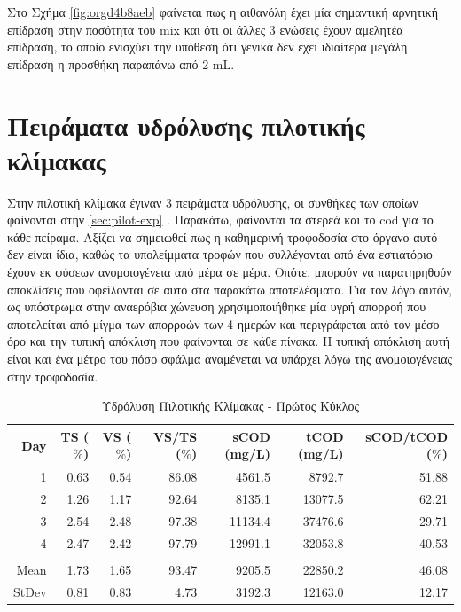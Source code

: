 \documentclass[11pt]{report}
\begin{document}
Στο Σχήμα \ref{fig:orgd4b8aeb} φαίνεται πως η αιθανόλη έχει μία σημαντική αρνητική επίδραση στην ποσότητα του \acrshort{mix} και ότι οι άλλες 3 ενώσεις έχουν αμελητέα επίδραση, το οποίο ενισχύει την υπόθεση ότι γενικά δεν έχει ιδιαίτερα μεγάλη επίδραση η προσθήκη παραπάνω από 2 mL.

\section{Πειράματα υδρόλυσης πιλοτικής κλίμακας}
\label{sec:orgef12589}
Στην πιλοτική κλίμακα έγιναν 3 πειράματα υδρόλυσης, οι συνθήκες των οποίων φαίνονται στην \autoref{sec:pilot-exp} . Παρακάτω, φαίνονται τα στερεά και το \acrshort{cod} για το κάθε πείραμα. Αξίζει να σημειωθεί πως η καθημερινή τροφοδοσία στο όργανο αυτό δεν είναι ίδια, καθώς τα υπολείμματα τροφών που συλλέγονται από ένα εστιατόριο έχουν εκ φύσεων ανομοιογένεια από μέρα σε μέρα. Οπότε, μπορούν να παρατηρηθούν αποκλίσεις που οφείλονται σε αυτό στα παρακάτω αποτελέσματα. Για τον λόγο αυτόν, ως υπόστρωμα στην αναερόβια χώνευση χρησιμοποιήθηκε μία υγρή απορροή που αποτελείται από μίγμα των απορροών των 4 ημερών και περιγράφεται από τον μέσο όρο και την τυπική απόκλιση που φαίνονται σε κάθε πίνακα. Η τυπική απόκλιση αυτή είναι και ένα μέτρο του πόσο σφάλμα αναμένεται να υπάρχει λόγω της ανομοιογένειας στην τροφοδοσία.

\begin{table}[htbp]
\caption{\label{tab:orge17860e}Υδρόλυση Πιλοτικής Κλίμακας - Πρώτος Κύκλος}
\centering
\begin{tabular}{rrrrrrr}
Day & TS (\(\%\)) & VS (\(\%\)) & VS/TS (\(\%\)) & sCOD (mg/L) & tCOD (mg/L) & sCOD/tCOD (\(\%\))\\[0pt]
\hline
1 & 0.63 & 0.54 & 86.08 & 4561.5 & 8792.7 & 51.88\\[0pt]
2 & 1.26 & 1.17 & 92.64 & 8135.1 & 13077.5 & 62.21\\[0pt]
3 & 2.54 & 2.48 & 97.38 & 11134.4 & 37476.6 & 29.71\\[0pt]
4 & 2.47 & 2.42 & 97.79 & 12991.1 & 32053.8 & 40.53\\[0pt]
 &  &  &  &  &  & \\[0pt]
Mean & 1.73 & 1.65 & 93.47 & 9205.5 & 22850.2 & 46.08\\[0pt]
StDev & 0.81 & 0.83 & 4.73 & 3192.3 & 12163.0 & 12.17\\[0pt]
\end{tabular}
\end{table}
\end{document}
